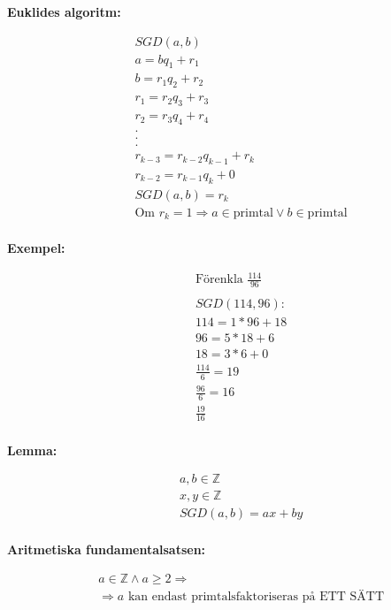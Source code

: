 \documentclass{article}
\begin{document}
\textbf{Euklides algoritm:}\par
\begin{align*}
  &\quad SGD(a,b) \\
  &\quad a = bq_1 + r_1 \\
  &\quad b = r_1q_2 + r_2 \\
  &\quad r_1 = r_2q_3 + r_3 \\
  &\quad r_2 = r_3q_4 + r_4 \\
  &\quad . \\
  &\quad . \\
  &\quad . \\
  &\quad r_{k-3} = r_{k-2}q_{k-1} + r_{k} \\
  &\quad r_{k-2} = r_{k-1}q_k + 0 \\
  &\quad SGD(a,b) = r_{k} \\
  &\quad \text{Om } r_{k} = 1 \Rightarrow a \in \text{primtal} \lor b \in \text{primtal} \\
\end{align*}

\newpage
\textbf{Exempel:}\par
\begin{align*}
  &\quad \text{Förenkla } \frac{114}{96} \\
  &\quad \\
  &\quad SGD(114,96):    \\
  &\quad 114 = 1*96 + 18 \\
  &\quad 96  = 5*18 + 6  \\
  &\quad 18  = 3*6  + 0  \\
  &\quad \frac{114}{6} = 19 \\
  &\quad \frac{96}{6}  = 16 \\
  &\quad \frac{19}{16} \\
\end{align*}


\textbf{Lemma:}\par
\begin{align*}
  &\quad  a, b \in \mathbb{Z} \\
  &\quad  x, y \in \mathbb{Z} \\
  &\quad  SGD(a,b) = ax + by  \\
\end{align*}


\textbf{Aritmetiska fundamentalsatsen:}\par
\begin{align*}
  &\quad  a \in \mathbb{Z} \land a \geq 2 \Rightarrow  \\
  &\quad  \Rightarrow a \text{ kan endast primtalsfaktoriseras på ETT SÄTT} \\
\end{align*}
\end{document}
